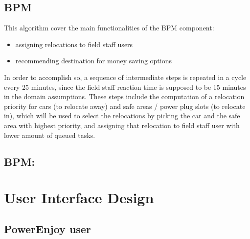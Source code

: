 \documentclass[english]{article}
\newcommand{\code}[2]{
  \hrulefill
  \subsection*{#1}
  
  \vspace{2em}
}
\begin{document}
	\subsection{BPM}
		This algorithm cover the main functionalities of the BPM component:
		\begin{itemize}
			\item assigning relocations to field staff users
			\item recommending destination for money saving options
		\end{itemize}
		In order to accomplish so, a sequence of intermediate steps is repeated in a cycle every 25 minutes, since the field staff reaction time is supposed to be 15 minutes in the domain assumptions.
		These steps include the computation of a relocation priority for cars (to relocate away) and safe areas / power plug slots (to relocate in), which will be used to select the relocations by picking the car and the safe area with highest priority, and assigning that relocation to field staff user with lower amount of queued tasks.
		\code{BPM: }{./Algorithm/bpm.py}
\section{User Interface Design}%
		\subsection{PowerEnjoy user}
\end{document}
